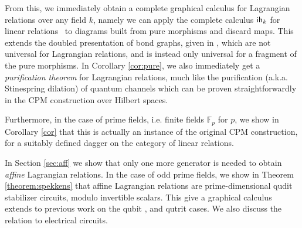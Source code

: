 From this, we immediately obtain a complete graphical calculus for Lagrangian relations over any field $k$, namely we can apply the complete calculus ${\sf ih}_k$ for linear relations~\cite{ihpub} to diagrams built from pure morphisms and discard maps. 
This extends the doubled presentation of bond graphs, given in \cite[5.3]{coya}, which are not universal for Lagrangian relations, and is instead only universal for a fragment of the pure morphisms.
In Corollary \ref{cor:pure}, we also immediately get a \textit{purification theorem} for Lagrangian relations, much like the purification (a.k.a. Stinespring dilation) of quantum channels which can be proven straightforwardly in the CPM construction over Hilbert spaces.


Furthermore, in the case of prime fields, i.e. finite fields $\mathbb F_p$ for $p$, we show in Corollary \ref{cor} that this is actually an instance of the original CPM construction, for a suitably defined dagger on the category of linear relations.


In Section \ref{sec:aff} we show that only one more generator is needed to obtain {\em affine} Lagrangian relations.  In the case of odd prime fields, we show in Theorem \ref{theorem:spekkens} that affine Lagrangian relations are prime-dimensional qudit stabilizer circuits, modulo invertible scalars.  This give a graphical calculus extends to previous work on the qubit \cite{backensspek}, and qutrit \cite{qutrit} cases.  We also discuss the relation to electrical circuits.


